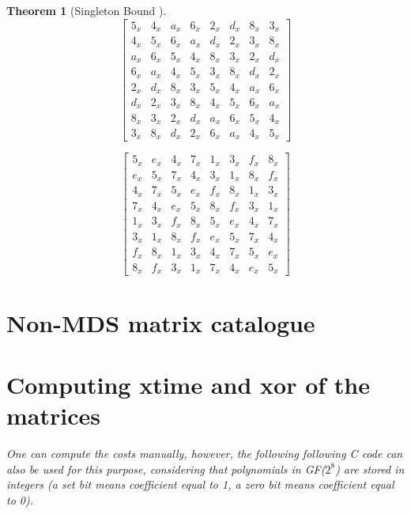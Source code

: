 \documentclass{report}
\newtheorem{theorem}{Theorem}{\bfseries}{\itshape}
\begin{document}
\begin{theorem}[Singleton Bound \cite{SloaneBook}]
\begin{equation}\label{mat:whirlwind-m0}
\begin{bmatrix}
5_x & 4_x & a_x & 6_x & 2_x & d_x & 8_x & 3_x\\
4_x & 5_x & 6_x & a_x & d_x & 2_x & 3_x & 8_x\\
a_x & 6_x & 5_x & 4_x & 8_x & 3_x & 2_x & d_x\\
6_x & a_x & 4_x & 5_x & 3_x & 8_x & d_x & 2_x\\
2_x & d_x & 8_x & 3_x & 5_x & 4_x & a_x & 6_x\\
d_x & 2_x & 3_x & 8_x & 4_x & 5_x & 6_x & a_x\\
8_x & 3_x & 2_x & d_x & a_x & 6_x & 5_x & 4_x\\
3_x & 8_x & d_x & 2_x & 6_x & a_x & 4_x & 5_x
\end{bmatrix}
\end{equation}

\begin{equation}\label{mat:whirlwind-m1}
\begin{bmatrix}
5_x & e_x & 4_x & 7_x & 1_x & 3_x & f_x & 8_x\\
e_x & 5_x & 7_x & 4_x & 3_x & 1_x & 8_x & f_x\\
4_x & 7_x & 5_x & e_x & f_x & 8_x & 1_x & 3_x\\
7_x & 4_x & e_x & 5_x & 8_x & f_x & 3_x & 1_x\\
1_x & 3_x & f_x & 8_x & 5_x & e_x & 4_x & 7_x\\
3_x & 1_x & 8_x & f_x & e_x & 5_x & 7_x & 4_x\\
f_x & 8_x & 1_x & 3_x & 4_x & 7_x & 5_x & e_x\\
8_x & f_x & 3_x & 1_x & 7_x & 4_x & e_x & 5_x
\end{bmatrix}
\end{equation}

\section{Non-MDS matrix catalogue}

\section{Computing \textbf{xtime} and \textbf{xor} of the matrices}

One can compute the costs manually, however, the following following C code can also be used for this purpose, considering that polynomials in GF($2^8$) are stored in integers (a set bit means coefficient equal to 1, a zero bit means coefficient equal to 0).


\end{theorem}
\end{document}
